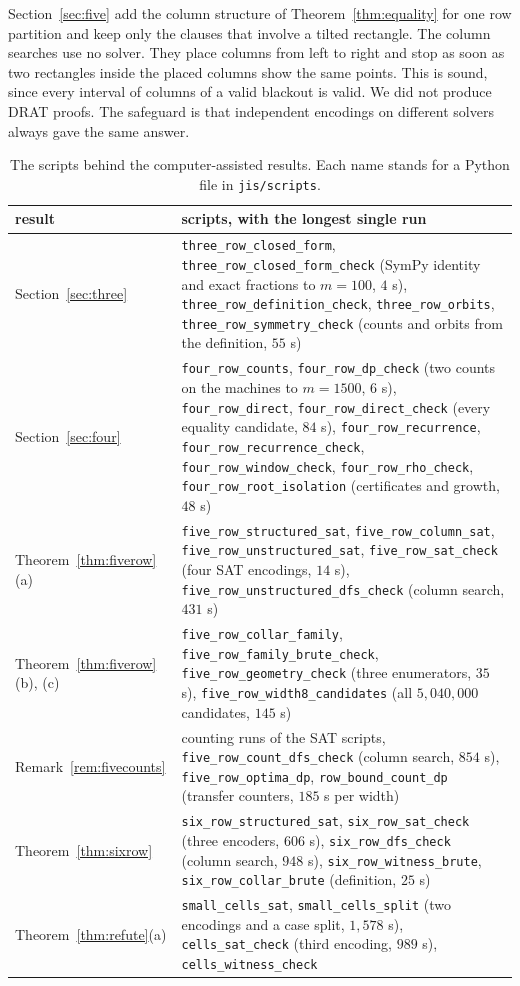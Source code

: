Section~\ref{sec:five} add the column structure of Theorem~\ref{thm:equality} for one row
partition and keep only the clauses that involve a tilted rectangle. The column searches use
no solver. They place columns from left to right and stop as soon as two rectangles inside
the placed columns show the same points. This is sound, since every interval of columns of a
valid blackout is valid. We did not produce DRAT proofs. The safeguard is that independent
encodings on different solvers always gave the same answer.

\begin{table}[!htb]
\centering\footnotesize
\begin{tabular}{@{}p{}p{}@{}}
\toprule
result & scripts, with the longest single run \\
\midrule
Section~\ref{sec:three}  & \raggedright \texttt{three\_row\_closed\_form}, \texttt{three\_row\_closed\_form\_check}
(SymPy identity and exact fractions to $m=100$, $4$ s), \texttt{three\_row\_definition\_check},
\texttt{three\_row\_orbits}, \texttt{three\_row\_symmetry\_check} (counts and orbits from the
definition, $55$ s) \tabularnewline
Section~\ref{sec:four}  & \raggedright \texttt{four\_row\_counts}, \texttt{four\_row\_dp\_check} (two counts on
the machines to $m=1500$, $6$ s), \texttt{four\_row\_direct}, \texttt{four\_row\_direct\_check}
(every equality candidate, $84$ s), \texttt{four\_row\_recurrence},
\texttt{four\_row\_recurrence\_check}, \texttt{four\_row\_window\_check},
\texttt{four\_row\_rho\_check}, \texttt{four\_row\_root\_isolation} (certificates and growth, $48$ s) \tabularnewline
Theorem~\ref{thm:fiverow}(a)  & \raggedright \texttt{five\_row\_structured\_sat}, \texttt{five\_row\_column\_sat},
\texttt{five\_row\_unstructured\_sat}, \texttt{five\_row\_sat\_check} (four SAT encodings,
$14$ s), \texttt{five\_row\_unstructured\_dfs\_check} (column search, $431$ s) \tabularnewline
Theorem~\ref{thm:fiverow}(b), (c)  & \raggedright \texttt{five\_row\_collar\_family},
\texttt{five\_row\_family\_brute\_check}, \texttt{five\_row\_geometry\_check} (three enumerators,
$35$ s), \texttt{five\_row\_width8\_candidates} (all $5{,}040{,}000$ candidates, $145$ s) \tabularnewline
Remark~\ref{rem:fivecounts}  & \raggedright counting runs of the SAT scripts,
\texttt{five\_row\_count\_dfs\_check} (column search, $854$ s), \texttt{five\_row\_optima\_dp},
\texttt{row\_bound\_count\_dp} (transfer counters, $185$ s per width) \tabularnewline
Theorem~\ref{thm:sixrow}  & \raggedright \texttt{six\_row\_structured\_sat}, \texttt{six\_row\_sat\_check}
(three encoders, $606$ s), \texttt{six\_row\_dfs\_check} (column search, $948$ s),
\texttt{six\_row\_witness\_brute}, \texttt{six\_row\_collar\_brute} (definition, $25$ s) \tabularnewline
Theorem~\ref{thm:refute}(a)  & \raggedright \texttt{small\_cells\_sat}, \texttt{small\_cells\_split} (two
encodings and a case split, $1{,}578$ s), \texttt{cells\_sat\_check} (third encoding, $989$ s),
\texttt{cells\_witness\_check} \tabularnewline
\bottomrule
\end{tabular}
\caption{The scripts behind the computer-assisted results. Each name stands for a Python file in \nolinkurl{jis/scripts}.}
\label{tab:scripts}
\end{table}

